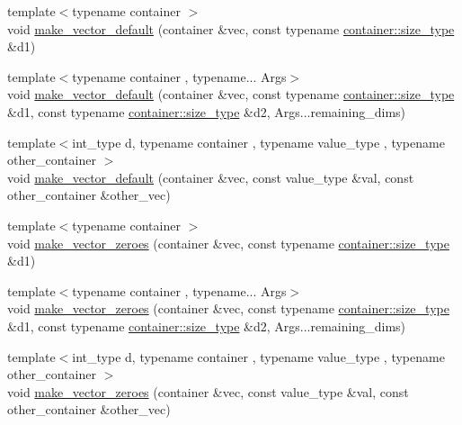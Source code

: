\begin{DoxyCompactItemize}
\item 
{\footnotesize template$<$typename container $>$ }\\void \hyperlink{namespaceIceBRG_adae9c4fcd34840e25150cbc7dede3acd}{make\-\_\-vector\-\_\-default} (container \&vec, const typename \hyperlink{lib_2IceBRG__main_2common_8h_a566c61f2ca17211f4ba8557f3f65e8d3}{container\-::size\-\_\-type} \&d1)
\item 
{\footnotesize template$<$typename container , typename... Args$>$ }\\void \hyperlink{namespaceIceBRG_afbf18251ba74da55c00f8f3215c221c2}{make\-\_\-vector\-\_\-default} (container \&vec, const typename \hyperlink{lib_2IceBRG__main_2common_8h_a566c61f2ca17211f4ba8557f3f65e8d3}{container\-::size\-\_\-type} \&d1, const typename \hyperlink{lib_2IceBRG__main_2common_8h_a566c61f2ca17211f4ba8557f3f65e8d3}{container\-::size\-\_\-type} \&d2, Args...\-remaining\-\_\-dims)
\item 
{\footnotesize template$<$int\-\_\-type d, typename container , typename value\-\_\-type , typename other\-\_\-container $>$ }\\void \hyperlink{namespaceIceBRG_a71eeb68549f8242b92eef96cfc87a06b}{make\-\_\-vector\-\_\-default} (container \&vec, const value\-\_\-type \&val, const other\-\_\-container \&other\-\_\-vec)
\item 
{\footnotesize template$<$typename container $>$ }\\void \hyperlink{namespaceIceBRG_a47bca7bc99b76f1c99a35a84fee5694e}{make\-\_\-vector\-\_\-zeroes} (container \&vec, const typename \hyperlink{lib_2IceBRG__main_2common_8h_a566c61f2ca17211f4ba8557f3f65e8d3}{container\-::size\-\_\-type} \&d1)
\item 
{\footnotesize template$<$typename container , typename... Args$>$ }\\void \hyperlink{namespaceIceBRG_a3639599d532b4861b6f0bb6295854d52}{make\-\_\-vector\-\_\-zeroes} (container \&vec, const typename \hyperlink{lib_2IceBRG__main_2common_8h_a566c61f2ca17211f4ba8557f3f65e8d3}{container\-::size\-\_\-type} \&d1, const typename \hyperlink{lib_2IceBRG__main_2common_8h_a566c61f2ca17211f4ba8557f3f65e8d3}{container\-::size\-\_\-type} \&d2, Args...\-remaining\-\_\-dims)
\item 
{\footnotesize template$<$int\-\_\-type d, typename container , typename value\-\_\-type , typename other\-\_\-container $>$ }\\void \hyperlink{namespaceIceBRG_a5791a10e6c507524702dee353e33086c}{make\-\_\-vector\-\_\-zeroes} (container \&vec, const value\-\_\-type \&val, const other\-\_\-container \&other\-\_\-vec)

\end{DoxyCompactItemize}
